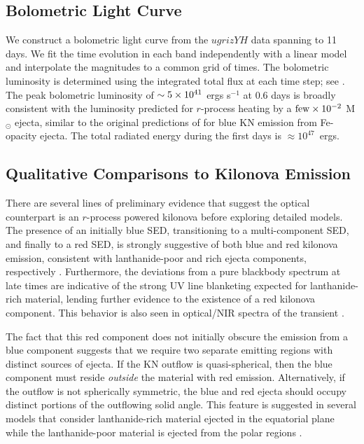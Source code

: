 \subsection{Bolometric Light Curve}
\label{sec:ch5_lc_bol}

We construct a bolometric light curve from the $ugrizYH$ data spanning to 11 days. We fit the time evolution in each band independently with a linear model and interpolate the magnitudes to a common grid of times. The bolometric luminosity is determined using the integrated total flux at each time step; see . The peak bolometric luminosity of $\sim5\times10^{41}$ ergs s$^{-1}$ at 0.6 days is broadly consistent with the luminosity predicted for $r$-process heating by a ${\rm few}\times 10^{-2}$ M$_{\odot}$ ejecta, similar to the original predictions of \cite{Metzger+10} for blue KN emission from Fe-opacity ejecta. The total radiated energy during the first  days is $\approx10^{47}$~ergs.

\subsection{Qualitative Comparisons to Kilonova Emission}
\label{sec:ch5_kn_compare}
There are several lines of preliminary evidence that suggest the optical counterpart is an $r$-process powered kilonova before exploring detailed models. The presence of an initially blue SED, transitioning to a multi-component SED, and finally to a red SED, is strongly suggestive of both blue and red kilonova emission, consistent with  lanthanide-poor and rich ejecta components, respectively \citep{Metzger+10,BarnesKasen13,Tanaka+14,MetzgerFernandez2014,Kasen+15,Wollaeger+17}. Furthermore, the deviations from a pure blackbody spectrum at late times are indicative of the strong UV line blanketing expected for lanthanide-rich material, lending further evidence to the existence of a red kilonova component. This behavior is also seen in optical/NIR spectra of the transient \citep{Chornock+17,Nicholl+17a}.

The fact that this red component does not initially obscure the emission from a blue component suggests that we require two separate emitting regions with distinct sources of ejecta. If the KN outflow is quasi-spherical, then the blue component must reside {\it outside} the material with red emission.  Alternatively, if the outflow is not spherically symmetric, the blue and red ejecta should occupy distinct portions of the outflowing solid angle. This feature is suggested in several models that consider lanthanide-rich material ejected in the equatorial plane while the lanthanide-poor material is ejected from the polar regions \citep{Kasen+15,Metzger2017}.

